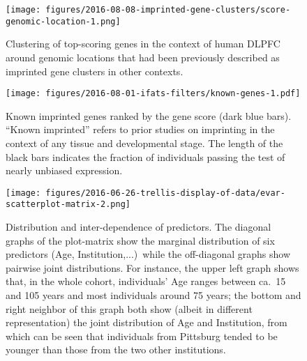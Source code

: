 \documentclass[12pt,letterpaper]{article}
\begin{document}

\setcounter{table}{0}
\makeatletter 
\renewcommand{\thetable}{S\@arabic\c@table}
\makeatother

\setcounter{figure}{0}
\makeatletter 
\renewcommand{\thefigure}{S\@arabic\c@figure}
\makeatother

\begin{figure}[h]
\begin{center}
\texttt{[image: figures/2016-08-08-imprinted-gene-clusters/score-genomic-location-1.png]}
\end{center}
\caption{
Clustering of top-scoring genes in the context of human DLPFC around genomic locations that
had been previously described as imprinted gene clusters in other contexts.
}
\label{fig:clusters}
\end{figure}

\begin{figure}[h]
\begin{center}
\texttt{[image: figures/2016-08-01-ifats-filters/known-genes-1.pdf]}
\caption{Known imprinted genes ranked by the gene score (dark blue bars).
``Known imprinted'' refers to prior studies on imprinting in the context of
any tissue and developmental stage.  The length of the
black bars indicates the fraction of individuals passing the test of nearly
unbiased expression.}
\label{fig:known-genes}
\end{center}
\end{figure}

\begin{figure}[h]
\begin{center}
\texttt{[image: figures/2016-06-26-trellis-display-of-data/evar-scatterplot-matrix-2.png]}
\end{center}
\caption{
Distribution and inter-dependence of predictors.  The diagonal graphs of the
plot-matrix show the marginal distribution of six predictors (Age,
Institution,...)~while the off-diagonal graphs show pairwise joint
distributions.  For instance, the upper left graph shows that, in the whole
cohort, individuals' Age
ranges between ca.~15 and 105 years and most individuals around 75 years; the
bottom and right neighbor of this graph both show (albeit in different
representation) the joint distribution of Age and Institution, from which can
be seen that individuals from Pittsburg tended to be younger than those from
the two other institutions.
}
\label{fig:predictor-associations}
\end{figure}
\end{document}
